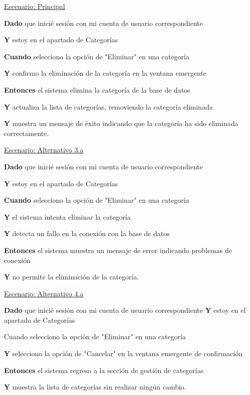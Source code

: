 \underline{Escenario: Principal}\par
\vspace{0.15cm}

\textbf{Dado} que inicié sesión con mi cuenta de usuario correspondiente\par
\textbf{Y} estoy en el apartado de Categorías\par
\textbf{Cuando} selecciono la opción de "Eliminar" en una categoría\par
\textbf{Y} confirmo la eliminación de la categoría en la ventana emergente\par
\textbf{Entonces} el sistema elimina la categoría de la base de datos\par
\textbf{Y} actualiza la lista de categorías, removiendo la categoría eliminada\par
\textbf{Y} muestra un mensaje de éxito indicando que la categoría ha sido eliminada correctamente.\par



\vspace{0.20cm}

\underline{Escenario: Alternativo 3.a}\par
\vspace{0.15cm}

\textbf{Dado} que inicié sesión con mi cuenta de usuario correspondiente\par
\textbf{Y} estoy en el apartado de Categorías\par
\textbf{Cuando} selecciono la opción de "Eliminar" en una categoría\par
\textbf{Y} el sistema intenta eliminar la categoría\par
\textbf{Y} detecta un fallo en la conexión con la base de datos\par
\textbf{Entonces} el sistema muestra un mensaje de error indicando problemas de conexión\par
\textbf{Y} no permite la eliminación de la categoría.\par


\vspace{0.20cm}

\underline{Escenario: Alternativo 4.a}\par
\vspace{0.15cm}

\textbf{Dado} que inicié sesión con mi cuenta de usuario correspondiente
\textbf{Y} estoy en el apartado de Categorías\par
Cuando selecciono la opción de "Eliminar" en una categoría\par
\textbf{Y} selecciono la opción de "Cancelar" en la ventana emergente de confirmación\par
\textbf{Entonces} el sistema regresa a la sección de gestión de categorías\par
\textbf{Y} muestra la lista de categorías sin realizar ningún cambio.\par


